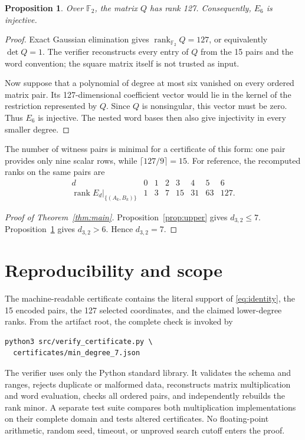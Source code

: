 \documentclass[11pt]{amsart}
\newtheorem{proposition}[theorem]{Proposition}
\theoremstyle{definition}
\newcommand{\F}{\mathbb F}
\begin{document}
\begin{proposition}\label{prop:lower}
Over \(\F_2\), the matrix \(Q\) has rank 127.  Consequently, \(E_6\) is
injective.
\end{proposition}

\begin{proof}
Exact Gaussian elimination gives \(\operatorname{rank}_{\F_2}Q=127\), or
equivalently \(\det Q=1\).  The verifier reconstructs every entry of \(Q\)
from the 15 pairs and the word convention; the square matrix itself is not
trusted as input.

Now suppose that a polynomial of degree at most six vanished on every ordered
matrix pair.  Its 127-dimensional coefficient vector would lie in the kernel of
the restriction represented by \(Q\).  Since \(Q\) is nonsingular, this vector
must be zero.  Thus \(E_6\) is injective.  The nested word bases then also give
injectivity in every smaller degree.
\end{proof}

The number of witness pairs is minimal for a certificate of this form: one pair
provides only nine scalar rows, while \(\lceil127/9\rceil=15\).  For reference,
the recomputed ranks on the same pairs are
\[
\begin{array}{c|rrrrrrr}
d&0&1&2&3&4&5&6\\ \hline
\operatorname{rank}E_d|_{\{(A_k,B_k)\}}&1&3&7&15&31&63&127.
\end{array}
\]

\begin{proof}[Proof of Theorem~\ref{thm:main}]
Proposition~\ref{prop:upper} gives \(d_{3,2}\le7\).
Proposition~\ref{prop:lower} gives \(d_{3,2}>6\).  Hence \(d_{3,2}=7\).
\end{proof}

\section{Reproducibility and scope}

The machine-readable certificate contains the literal support of
\eqref{eq:identity}, the 15 encoded pairs, the 127 selected coordinates, and the
claimed lower-degree ranks.  From the artifact root, the complete check is
invoked by
\begin{verbatim}
python3 src/verify_certificate.py \
  certificates/min_degree_7.json
\end{verbatim}
The verifier uses only the Python standard library.  It validates the schema and
ranges, rejects duplicate or malformed data, reconstructs matrix multiplication
and word evaluation, checks all ordered pairs, and independently rebuilds the
rank minor.  A separate test suite compares both multiplication implementations
on their complete domain and tests altered certificates.  No floating-point
arithmetic, random seed, timeout, or unproved search cutoff enters the proof.
\end{document}
